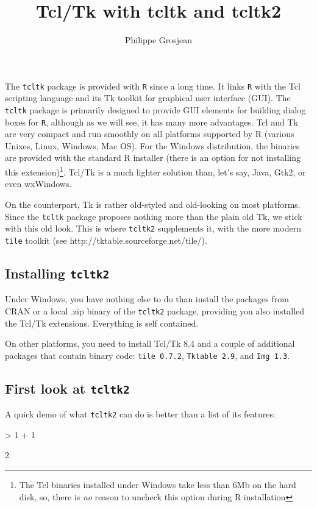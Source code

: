 \documentclass[a4paper]{article}
\title{Tcl/Tk with tcltk and tcltk2}
\author{Philippe Grosjean}
\newcommand{\tcltk}{{\tt tcltk}}
\newcommand{\R}{{\tt R}}
\begin{document}
\maketitle

The \tcltk{} package is provided with \R{} since a long time. It links \R{} with
the Tcl scripting language and its Tk toolkit for graphical user interface (GUI).
The \tcltk{} package is primarily designed to provide
GUI elements for building dialog boxes for \R{}, although as we will see, it has
many more advantages. Tcl and Tk are very compact and run smoothly on all
platforms supported by R (various Unixes, Linux, Windows, Mac OS). For the
Windows distribution, the binaries are provided with the standard R installer
(there is an option for not installing this extension)\footnote{The Tcl binaries
installed under Windows take less than 6Mb on the hard disk, so, there is
\emph{no} reason to uncheck this option during R installation}. Tcl/Tk is a much
lighter solution than, let's say, Java, Gtk2, or even wxWindows.

On the counterpart, Tk is rather old-styled and old-looking on most platforms.
Since the \tcltk{} package proposes nothing more than the plain old Tk, we stick
with this old look. This is where {\tt tcltk2} supplements it, with the more modern
{\tt tile} toolkit (see http://tktable.sourceforge.net/tile/). 

\subsection*{Installing {\tt tcltk2}}

Under Windows, you have nothing else to do than install the packages from CRAN
or a local .zip binary of the {\tt tcltk2} package, providing you also installed
the Tcl/Tk extensions. Everything is self contained.

On other platforms, you need to install Tcl/Tk 8.4 and a couple of additional
packages that contain binary code: {\tt tile 0.7.2}, {\tt Tktable 2.9}, and
{\tt Img 1.3}.

\subsection*{First look at {\tt tcltk2}}

A quick demo of what {\tt tcltk2} can do is better than a list of its features:

\begin{Schunk}
\begin{Sinput}
> 1 + 1
\end{Sinput}
\begin{Soutput}
[1] 2
\end{Soutput}
\end{Schunk}
\end{document}
